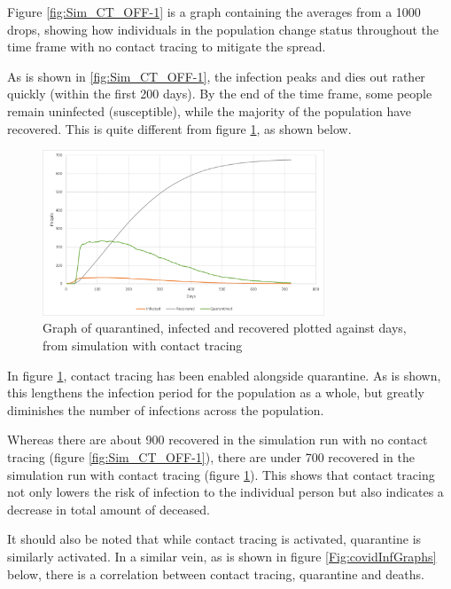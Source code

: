 Figure \ref{fig:Sim_CT_OFF-1} is a graph containing the averages from a 1000 drops, showing how individuals in the population change status throughout the time frame with no contact tracing to mitigate the spread.

As is shown in \ref{fig:Sim_CT_OFF-1}, the infection peaks and dies out rather quickly (within the first 200 days). By the end of the time frame, some people remain uninfected (susceptible), while the majority of the population have recovered. This is quite different from figure \ref{fig:Sim_CT_ON-1}, as shown below.

\begin{figure}[H]
    \centering
    \includegraphics[width=0.75\textwidth]{0_billeder/Sim_CT_ON.png}
    \caption{Graph of quarantined, infected and recovered plotted against days, from simulation with contact tracing}
    \label{fig:Sim_CT_ON-1}
\end{figure}

In figure \ref{fig:Sim_CT_ON-1}, contact tracing has been enabled alongside quarantine. As is shown, this lengthens the infection period for the population as a whole, but greatly diminishes the number of infections across the population. 

Whereas there are about 900 recovered in the simulation run with no contact tracing (figure \ref{fig:Sim_CT_OFF-1}), there are under 700 recovered in the simulation run with contact tracing (figure \ref{fig:Sim_CT_ON-1}). This shows that contact tracing not only lowers the risk of infection to the individual person but also indicates a decrease in total amount of deceased. 

It should also be noted that while contact tracing is activated, quarantine is similarly activated. In a similar vein, as is shown in figure \ref{Fig:covidInfGraphs} below, there is a correlation between contact tracing, quarantine and deaths.

